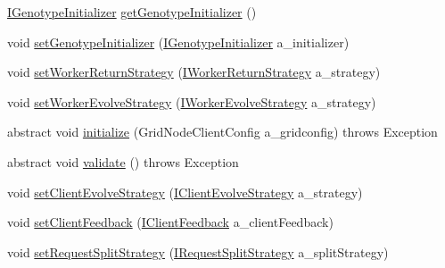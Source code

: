 \begin{DoxyCompactItemize}
\hyperlink{interfaceorg_1_1jgap_1_1distr_1_1grid_1_1_i_genotype_initializer}{I\-Genotype\-Initializer} \hyperlink{classorg_1_1jgap_1_1distr_1_1grid_1_1_grid_configuration_base_a177b87d9913e26b0fa6ba8c5b8127800}{get\-Genotype\-Initializer} ()
\item 
void \hyperlink{classorg_1_1jgap_1_1distr_1_1grid_1_1_grid_configuration_base_ad852cef117052acb13e53e7befc38d1c}{set\-Genotype\-Initializer} (\hyperlink{interfaceorg_1_1jgap_1_1distr_1_1grid_1_1_i_genotype_initializer}{I\-Genotype\-Initializer} a\-\_\-initializer)
\item 
void \hyperlink{classorg_1_1jgap_1_1distr_1_1grid_1_1_grid_configuration_base_a5bb747ca7e596d2e0b527887a3cc5e0e}{set\-Worker\-Return\-Strategy} (\hyperlink{interfaceorg_1_1jgap_1_1distr_1_1grid_1_1_i_worker_return_strategy}{I\-Worker\-Return\-Strategy} a\-\_\-strategy)
\item 
void \hyperlink{classorg_1_1jgap_1_1distr_1_1grid_1_1_grid_configuration_base_a76731207cc7b016d58cbf9f511b0f413}{set\-Worker\-Evolve\-Strategy} (\hyperlink{interfaceorg_1_1jgap_1_1distr_1_1grid_1_1_i_worker_evolve_strategy}{I\-Worker\-Evolve\-Strategy} a\-\_\-strategy)
\item 
abstract void \hyperlink{classorg_1_1jgap_1_1distr_1_1grid_1_1_grid_configuration_base_a882c5ff25e4da769b0648f8f749f601c}{initialize} (Grid\-Node\-Client\-Config a\-\_\-gridconfig)  throws Exception
\item 
abstract void \hyperlink{classorg_1_1jgap_1_1distr_1_1grid_1_1_grid_configuration_base_a5715343422e2793d0e1c4d2505a813b2}{validate} ()  throws Exception
\item 
void \hyperlink{classorg_1_1jgap_1_1distr_1_1grid_1_1_grid_configuration_base_a3b48d890153b3c2400c5a86f0219f40d}{set\-Client\-Evolve\-Strategy} (\hyperlink{interfaceorg_1_1jgap_1_1distr_1_1grid_1_1_i_client_evolve_strategy}{I\-Client\-Evolve\-Strategy} a\-\_\-strategy)
\item 
void \hyperlink{classorg_1_1jgap_1_1distr_1_1grid_1_1_grid_configuration_base_a9276cb25257f26884f6d32056f047e1b}{set\-Client\-Feedback} (\hyperlink{interfaceorg_1_1jgap_1_1distr_1_1grid_1_1_i_client_feedback}{I\-Client\-Feedback} a\-\_\-client\-Feedback)
\item 
void \hyperlink{classorg_1_1jgap_1_1distr_1_1grid_1_1_grid_configuration_base_af6fae0e7006e006dc769c036eb331fa8}{set\-Request\-Split\-Strategy} (\hyperlink{interfaceorg_1_1jgap_1_1distr_1_1grid_1_1_i_request_split_strategy}{I\-Request\-Split\-Strategy} a\-\_\-split\-Strategy)
\end{DoxyCompactItemize}
